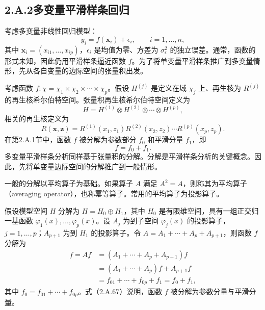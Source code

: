 \subsection*{2.A.2\quad 多变量平滑样条回归}

考虑多变量非线性回归模型：
\begin{equation}
y_i=f(\boldsymbol x_i)+\epsilon_i,\qquad i=1,\ldots,n,\tag{2.A.63}
\end{equation}
其中 $\boldsymbol x_i=(x_{i1},\ldots,x_{ip})$，$\epsilon_i$ 是均值为零、方差为 $\sigma_\epsilon^2$ 的独立误差。通常，函数的形式未知，因此仍用平滑样条逼近函数 $f$。为了将单变量平滑样条推广到多变量情形，先从各自变量的边际空间的张量积出发。

考虑函数 $f:\chi=\chi_1\times\chi_2\times\cdots\times\chi_p$。假设 $H^{(j)}$ 是定义在域 $\chi_j$ 上、再生核为 $R^{(j)}$ 的再生核希尔伯特空间。张量积再生核希尔伯特空间定义为
\begin{equation}
H=H^{(1)}\otimes H^{(2)}\otimes\cdots\otimes H^{(p)},\tag{2.A.64}
\end{equation}
相关的再生核定义为
\begin{equation}
R(\boldsymbol x,\boldsymbol z)=
R^{(1)}(x_1,z_1)R^{(2)}(x_2,z_2)\cdots R^{(p)}(x_p,z_p).\tag{2.A.65}
\end{equation}
在第2.A.1节中，函数 $f$ 被分解为参数部分 $f_0$ 和平滑分量 $f_1$，即
\begin{equation}
f=f_0+f_1.\tag{2.A.66}
\end{equation}
多变量平滑样条分析同样基于张量积的分解。分解是平滑样条分析的关键概念。因此，先将单变量边际空间的分解推广到一般情形。

一般的分解以平均算子为基础。如果算子 $A$ 满足 $A^2=A$，则称其为平均算子（averaging operator），也称幂等算子。常用的平均算子为投影算子。

假设模型空间 $H$ 分解为 $H=H_0\oplus H_1$，其中 $H_0$ 是有限维空间，具有一组正交归一基函数 $\varphi_1(x),\ldots,\varphi_p(x)$。设 $A_j$ 为到子空间 $\varphi_j(x)$ 的投影算子，$j=1,\ldots,p$；$A_{p+1}$ 为到 $H_1$ 的投影算子。令 $A=A_1+\cdots+A_p+A_{p+1}$，则函数 $f$ 分解为
\begin{equation}
\begin{aligned}
f=Af&=(A_1+\cdots+A_p+A_{p+1})f\\
 &=(A_1+\cdots+A_p)f+A_{p+1}f\\
 &=f_{01}+\cdots+f_{0p}+f_1=f_0+f_1,
\end{aligned}\tag{2.A.67}
\end{equation}
其中 $f_0=f_{01}+\cdots+f_{0p}$。式（2.A.67）说明，函数 $f$ 被分解为参数分量与平滑分量。

